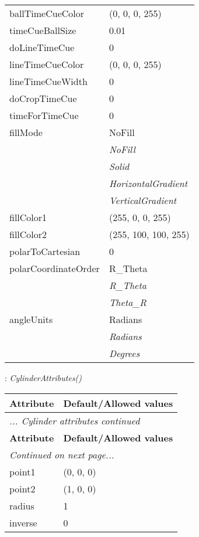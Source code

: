 \documentclass[10pt,a4paper]{report}
\begin{document}
\begin{longtable}{ll}
ballTimeCueColor  &  (0, 0, 0, 255) \\
timeCueBallSize  &  0.01 \\
doLineTimeCue  &  0 \\
lineTimeCueColor  &  (0, 0, 0, 255) \\
lineTimeCueWidth  &  0 \\
doCropTimeCue  &  0 \\
timeForTimeCue  &  0 \\
fillMode  &  NoFill   \\
 & {\it  NoFill} \\
 & {\it  Solid} \\
 & {\it  HorizontalGradient} \\
 & {\it  VerticalGradient} \\
fillColor1  &  (255, 0, 0, 255) \\
fillColor2  &  (255, 100, 100, 255) \\
polarToCartesian  &  0 \\
polarCoordinateOrder  &  R\_Theta   \\
 & {\it  R\_Theta} \\
 & {\it  Theta\_R} \\
angleUnits  &  Radians   \\
 & {\it  Radians} \\
 & {\it  Degrees} \\
\end{longtable}

\newpage

{}
: {\it CylinderAttributes() }\\[-3mm]

\begin{longtable}{ll}
{\bf Attribute} & {\bf Default/Allowed values} \\
\hline \hline
\endfirsthead
\multicolumn{2}{l}{{\it ... Cylinder attributes continued}} \\
{\bf Attribute} & {\bf Default/Allowed values} \\
\hline \hline
\endhead
\hline
\multicolumn{2}{l}{{\it Continued on next page...}} \\
\endfoot
\hline
\endlastfoot

point1  &  (0, 0, 0) \\
point2  &  (1, 0, 0) \\
radius  &  1 \\
inverse  &  0 \\
\end{longtable}
\end{document}
